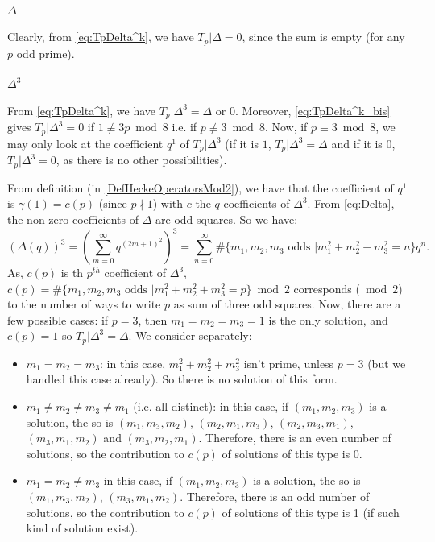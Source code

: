 \paragraph{$\Delta$}
Clearly, from \eqref{eq:TpDelta^k}, we have $T_p|\Delta = 0$, since the sum is empty (for any $p$ odd prime).

\paragraph{$\Delta^3$}
From \eqref{eq:TpDelta^k}, we have $T_p|\Delta^3 = \Delta \text{ or } 0$. Moreover, \eqref{eq:TpDelta^k_bis} gives $T_p|\Delta^3 = 0$ if $1 \not\equiv 3p \bmod 8$ i.e. if $p \not\equiv 3 \bmod 8$.
Now, if $p \equiv 3 \bmod 8$, we may only look at the coefficient $q^1$ of $T_p|\Delta^3$ (if it is $1$, $T_p|\Delta^3 = \Delta$ and if it is $0$, $T_p|\Delta^3 = 0$, as there is no other possibilities).

From definition (in \ref{DefHeckeOperatorsMod2}), we have that the coefficient of $q^1$ is $\gamma(1) = c(p)$ (since $p \nmid 1$) with $c$ the $q$ coefficients of $\Delta^3$.
From \eqref{eq:Delta}, the non-zero coefficients of $\Delta$ are odd squares.
So we have:
$$
\left( \Delta(q) \right)^3
= \left( \sum_{m=0}^{\infty} q^{(2m+1)^2} \right)^3
= \sum_{n=0}^{\infty} \#\{m_1, m_2, m_3 \text{ odds } | m_1^2 + m_2^2 + m_3^2 = n\} q^n.
$$
As, $c(p)$ is th $p^{th}$ coefficient of $\Delta^3$, $c(p) = \#\{m_1, m_2, m_3 \text{ odds } | m_1^2 + m_2^2 + m_3^2 = p\} \bmod 2$ corresponds ($\bmod 2$) to the number of ways to write $p$ as sum of three odd squares.
Now, there are a few possible cases:
if $p=3$, then $m_1=m_2=m_3=1$ is the only solution, and $c(p)=1$ so $T_p|\Delta^3=\Delta$.
We consider separately:
\begin{itemize}
	\item $m_1=m_2=m_3$: in this case, $m_1^2 + m_2^2 + m_3^2$ isn't prime, unless $p=3$ (but we handled this case already). So there is no solution of this form.
	\item $m_1 \neq m_2 \neq m_3 \neq m_1$ (i.e. all distinct): in this case, if $(m_1, m_2, m_3)$ is a solution, the so is $(m_1, m_3, m_2)$, $(m_2, m_1, m_3)$, $(m_2, m_3, m_1)$, $(m_3, m_1, m_2)$ and $(m_3, m_2, m_1)$. Therefore, there is an even number of solutions, so the contribution to $c(p)$ of solutions of this type is 0.
	\item $m_1 = m_2\neq m_3$ in this case, if $(m_1, m_2, m_3)$ is a solution, the so is $(m_1, m_3, m_2)$, $(m_3, m_1, m_2)$. Therefore, there is an odd number of solutions, so the contribution to $c(p)$ of solutions of this type is 1 (if such kind of solution exist).
\end{itemize}

